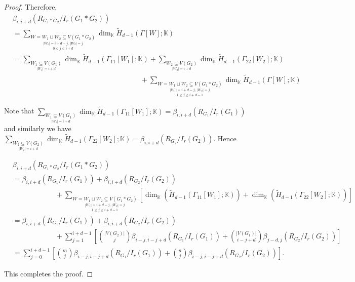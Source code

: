 \documentclass[12pt,reqno]{amsart}
\theoremstyle{definition}
\newcommand{\K}{\mathbb K}
\begin{document}
\begin{proof}
\noindent
    Therefore,
    {\footnotesize
    \begin{align*}
       &\beta_{i,i+d}(R_{G_1*G_2}/I_r(G_1*G_2))\\
       &=\sum_{\underset{0\le j\le i+d}{\underset{|W_1|=i+d-j,\,|W_2|=j}{W=W_1\sqcup W_2 \subseteq V(G_1*G_2) }}} \dim_{\mathbb{K}} \widetilde{H}_{d-1}(\Gamma[W]; \mathbb{K})\\
       &=\sum_{\underset{|W_1|=i+d}{W_1 \subseteq V(G_1) }} \dim_{\mathbb{K}} \widetilde{H}_{d-1}(\Gamma_{11}[W_1]; \mathbb{K})+\sum_{\underset{|W_2|=i+d}{W_2 \subseteq V(G_2) }} \dim_{\mathbb{K}} \widetilde{H}_{d-1}(\Gamma_{22}[W_2]; \mathbb{K})\\
       &\hspace{18em}+\sum_{\underset{1\le j\le i+d-1}{\underset{|W_1|=i+d-j,\,|W_2|=j}{W=W_1\sqcup W_2 \subseteq V(G_1*G_2) }}} \dim_{\mathbb{K}} \widetilde{H}_{d-1}(\Gamma[W]; \mathbb{K})
       \end{align*}
       }

\noindent
Note that $\sum_{\underset{|W_1|=i+d}{W_1 \subseteq V(G_1) }} \dim_{\mathbb{K}} \widetilde{H}_{d-1}(\Gamma_{11}[W_1]; \mathbb{K})=\beta_{i,i+d}(R_{G_1}/I_r(G_1))$ and similarly we have $\sum_{\underset{|W_2|=i+d}{W_2 \subseteq V(G_2) }} \dim_{\mathbb{K}} \widetilde{H}_{d-1}(\Gamma_{22}[W_2]; \mathbb{K})=\beta_{i,i+d}(R_{G_2}/I_r(G_2))$. Hence

       {\footnotesize
       \begin{align*}
       &\beta_{i,i+d}(R_{G_1*G_2}/I_r(G_1*G_2))\\
       &=\beta_{i,i+d}(R_{G_1}/I_r(G_1))+\beta_{i,i+d}(R_{G_2}/I_r(G_2))\\
       &\hspace{6em}+\sum_{\underset{1\le j\le i+d-1}{\underset{|W_1|=i+d-j,\,|W_2|=j}{W=W_1\sqcup W_2 \subseteq V(G_1*G_2) }}}\left[\dim_{\K}(\widetilde H_{d-1}(\Gamma_{11}[W_1];\K))+\dim_{\K}(\widetilde H_{d-1}(\Gamma_{22}[W_2];\K))\right]\\
       &=\beta_{i,i+d}(R_{G_1}/I_r(G_1))+\beta_{i,i+d}(R_{G_2}/I_r(G_2))\\
       &\hspace{6em}+\sum_{j=1}^{i+d-1}\left[ {|V(G_2)|\choose j}\beta_{i-j,i-j+d}(R_{G_1}/I_r(G_1))+{|V(G_1)|\choose i-j+d}\beta_{j-d,j}(R_{G_2}/I_r(G_2)) \right]\\
       &=\sum_{j=0}^{i+d-1}\left[{m\choose j}\beta_{i-j,i-j+d}(R_{G_1}/I_r(G_1))+{n\choose j}\beta_{i-j,i-j+d}(R_{G_2}/I_r(G_2)) \right].
       \end{align*}}

       This completes the proof.
\end{proof}
\end{document}
